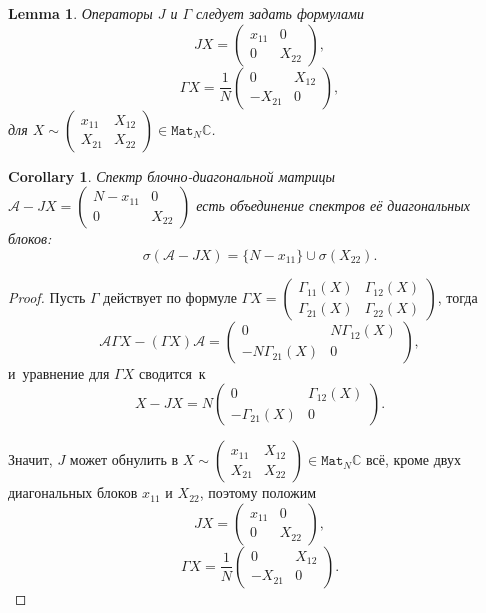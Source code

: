 \documentclass[14pt,a4paper]{extarticle}
\newtheorem{lem}{Lemma}
\newtheorem{crl}{Corollary}
\theoremstyle{definition}
\begin{document}
\begin{lem}
    Операторы \( J \) и \( \Gamma \)
    следует задать формулами
    \[
        J X = \begin{pmatrix} x_{11} & 0 \\ 0 & X_{22} \end{pmatrix}, \]
    \[
        \Gamma X = \frac{1}{N} \begin{pmatrix} 0 & X_{12} \\ -X_{21} & 0 \end{pmatrix}, \]
        для \( X\sim \begin{pmatrix}x_{11} & X_{12} \\ X_{21} & X_{22}\end{pmatrix} \in \mathtt{Mat}_N\mathbb{C} \).

\end{lem}
\begin{crl}
    Спектр блочно-диагональной матрицы
    \( \mathcal{A} - JX = \begin{pmatrix} N - x_{11} & 0 \\ 0 & X_{22} \end{pmatrix} \)
    есть объединение спектров е\"е диагональных блоков:
    \[
        \sigma(\mathcal{A} - J X) = \{ N - x_{11} \} \cup \sigma(X_{22}). \]
\end{crl}
\begin{proof}
Пусть \( \Gamma \) действует по формуле
\( \Gamma X = \begin{pmatrix} \Gamma_{11}(X) & \Gamma_{12}(X) \\
                              \Gamma_{21}(X) & \Gamma_{22}(X)
                              \end{pmatrix} \), тогда
\[
    \mathcal{A} \Gamma X - (\Gamma X)\mathcal{A} = 
    \begin{pmatrix} 0 & N\Gamma_{12}(X) \\
        - N\Gamma_{21}(X) & 0
        \end{pmatrix}, \]
и~уравнение для \( \Gamma X \) сводится~к
\[
    X - J X =
    N \begin{pmatrix} 0 & \Gamma_{12}(X) \\
        - \Gamma_{21}(X) & 0
        \end{pmatrix}. \]

Значит, \( J \) может обнулить в
    \( X \sim
    \begin{pmatrix}
    x_{11} & X_{12} \\
    X_{21} & X_{22}
    \end{pmatrix} \in \mathtt{Mat}_N\mathbb{C} \)
    вс\"е, кроме двух диагональных блоков \( x_{11} \) и \( X_{22} \),
    поэтому положим
\[
    J X = \begin{pmatrix} x_{11} & 0 \\ 0 & X_{22} \end{pmatrix}, \]
\[
    \Gamma X = \frac{1}{N}\begin{pmatrix} 0 & X_{12} \\ -X_{21} & 0 \end{pmatrix}. \]
\end{proof}
\end{document}
